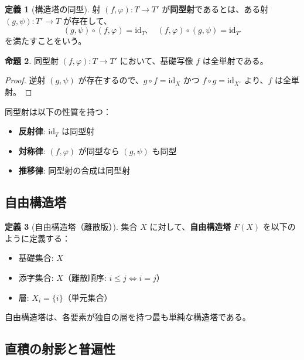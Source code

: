 \documentclass[a4paper,12pt]{ltjsarticle}
\theoremstyle{definition}
\newtheorem{definition}{定義}[section]
\newtheorem{proposition}[definition]{命題}
\begin{document}
\begin{definition}[構造塔の同型]
\label{def:tower-isomorphism}
射 $(f, \varphi): T \to T'$ が\textbf{同型射}であるとは、ある射 $(g, \psi): T' \to T$ が存在して、
\[
(g, \psi) \circ (f, \varphi) = \mathrm{id}_T, \quad (f, \varphi) \circ (g, \psi) = \mathrm{id}_{T'}
\]
を満たすことをいう。
\end{definition}

\begin{proposition}
同型射 $(f, \varphi): T \to T'$ において、基礎写像 $f$ は全単射である。
\end{proposition}

\begin{proof}
逆射 $(g, \psi)$ が存在するので、$g \circ f = \mathrm{id}_X$ かつ $f \circ g = \mathrm{id}_{X'}$ より、$f$ は全単射。
\end{proof}

同型射は以下の性質を持つ：
\begin{itemize}
\item \textbf{反射律}: $\mathrm{id}_T$ は同型射
\item \textbf{対称律}: $(f, \varphi)$ が同型なら $(g, \psi)$ も同型
\item \textbf{推移律}: 同型射の合成は同型射
\end{itemize}

\subsection{自由構造塔}

\begin{definition}[自由構造塔（離散版）]
\label{def:free-tower-discrete}
集合 $X$ に対して、\textbf{自由構造塔} $F(X)$ を以下のように定義する：
\begin{itemize}
\item 基礎集合: $X$
\item 添字集合: $X$（離散順序: $i \leq j \Leftrightarrow i = j$）
\item 層: $X_i = \{i\}$（単元集合）
\end{itemize}
\end{definition}

自由構造塔は、各要素が独自の層を持つ最も単純な構造塔である。

\subsection{直積の射影と普遍性}
\end{document}
